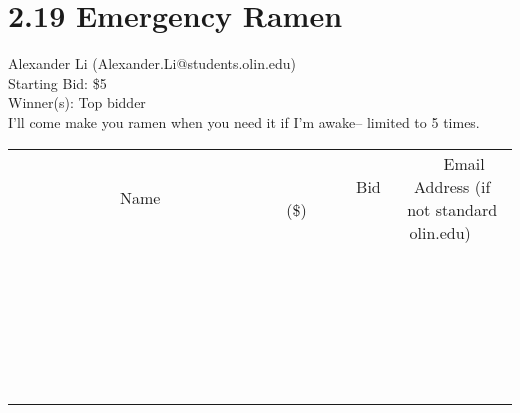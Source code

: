 \documentclass[11pt]{article}
\begin{document}
\section*{2.19 Emergency Ramen}
Alexander Li (Alexander.Li@students.olin.edu) \\
Starting Bid: \$5 \\
Winner(s): 
Top bidder \\
I'll come make you ramen when you need it if I'm awake-- limited to 5 times. \\[6ex]
\begin{tabular}{c c c}
~~~~~~~~~~~~~Name~~~~~~~~~~~~~ & ~~~~~~~~~Bid (\$)~~~~~~~~~ & ~~~Email Address (if not standard olin.edu)~~~ \\
 & & \\
\hline
 & & \\
\hline
 & & \\
\hline
 & & \\
\hline
 & & \\
\hline
 & & \\
\hline
 & & \\
\hline
 & & \\
\hline
 & & \\
\hline
 & & \\
\hline
 & & \\
\hline
 & & \\
\hline
 & & \\
\hline
 & & \\
\hline
 & & \\
\hline
 & & \\
\hline
 & & \\
\hline
 & & \\
\hline
 & & \\
\hline
 & & \\
\hline
 & & \\
\hline
 & & \\
\hline
 & & \\
\hline
 & & \\
\hline
 & & \\
\hline
 & & \\
\hline
\end{tabular}
\clearpage
\end{document}
